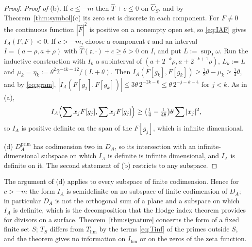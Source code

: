 \documentclass[11pt]{amsart}
\theoremstyle{definition}
\theoremstyle{remark}
\newcommand{\Th}{\widehat{T}}
\newcommand{\Ch}{\widehat{C}_S}
\newcommand{\DA}{D_A}
\begin{document}
\begin{proof}
\emph{Proof of} (b).  If $c\le-m$ then $\Th+c\le0$ on $\Ch$, and by
Theorem~\ref{thm:symbol}(c) its zero set is discrete in each component.  For
$F\ne0$ the continuous function $|\widehat F|^{2}$ is positive on a nonempty
open set, so \eqref{eq:IAF} gives $I_A(F,F)<0$.  If $c>-m$, choose a component
$\mathfrak c$ and an interval $I=(a-\rho,a+\rho)$ with
$\Th(\mathfrak c,\cdot)+c\ge\theta>0$ on $I$, and put $L:=\sup_I\omega$.
Run the inductive construction with $I_k$ a subinterval of
$(a+2^{-k}\rho,a+2^{-k+1}\rho)$, $L_k:=L$ and
$\mu_k=\eta_k:=\theta^{2}2^{-4k-12}/(L+\theta)$.  Then
$I_A(F[g_k],F[g_k])\ge\tfrac12\theta-\mu_k\ge\tfrac14\theta$,
and by \eqref{eq:gram}, $|I_A(F[g_j],F[g_k])|\le3\theta\,2^{-2k-6}\le
\theta\,2^{-j-k-4}$ for $j<k$.  As in (a),
\[
I_A\Bigl(\sum x_jF[g_j],\sum x_jF[g_j]\Bigr)\ge
\bigl(\tfrac14-\tfrac1{48}\bigr)\theta\sum|x_j|^{2},
\]
so $I_A$ is positive definite on the span of the $F[g_j]$, which is
infinite dimensional.

(d)  $\DA^{\mathrm{prim}}$ has codimension two in $\DA$, so its intersection
with an infinite-dimensional subspace on which $I_A$ is definite is
infinite dimensional, and $I_A$ is definite on it.  The second statement of
(b) restricts to any subspace.
\end{proof}

The argument of (d) applies to every subspace of finite codimension.  Hence
for $c>-m$ the form $I_A$ is semidefinite on no subspace of finite codimension
of $\DA$; in particular $\DA$ is not the orthogonal sum of a plane and a
subspace on which $I_A$ is definite, which is the decomposition that the Hodge
index theorem provides for divisors on a surface.
Theorem~\ref{thm:signature} concerns the form of a fixed finite set $S$;
$T_S$ differs from $T_{\lim}$ by the terms \eqref{eq:Tinf} of the primes
outside $S$, and the theorem gives no information on $I_{\lim}$ or on the
zeros of the zeta function.
\end{document}
